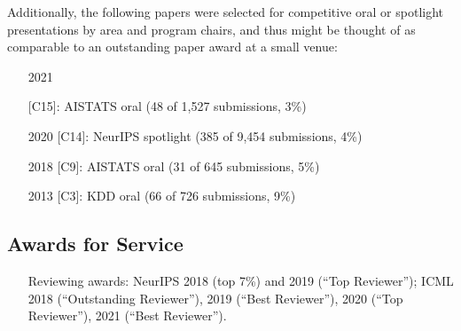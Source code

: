\documentclass[10pt]{article}
\begin{document}
Additionally, the following papers were selected for competitive oral or spotlight presentations by area and program chairs,
and thus might be thought of as comparable to an outstanding paper award at a small venue:
\begin{itemize}[leftmargin=5em]
  \item[2021] 
  \item[    ] [C15]: AISTATS oral (48 of 1,527 submissions, 3\%)
  \item[2020] [C14]: NeurIPS spotlight (385 of 9,454 submissions, 4\%)
  \item[2018] \phantom{1}[C9]: AISTATS oral (31 of 645 submissions, 5\%)
  \item[2013] \phantom{1}[C3]: KDD oral (66 of 726 submissions, 9\%)
\end{itemize}

\subsection{Awards for Service} %
\begin{itemize}
  \item[] Reviewing awards: NeurIPS 2018 (top 7\%) and 2019 (``Top Reviewer''); ICML 2018 (``Outstanding Reviewer''), 2019 (``Best Reviewer''), 2020 (``Top Reviewer''), 2021 (``Best Reviewer'').
\end{itemize}

%
\end{document}
